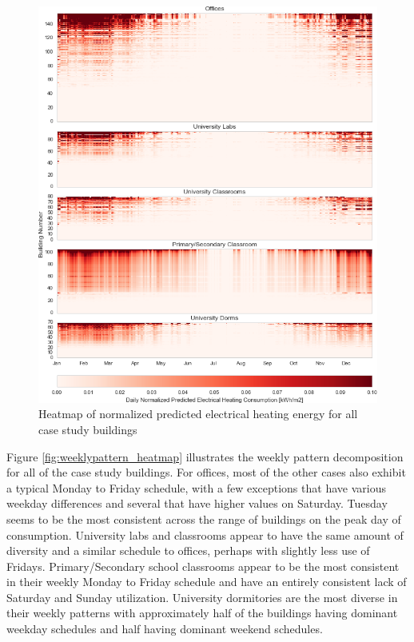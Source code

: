 \begin{figure}[ht!]
\begin{center}
\includegraphics[width=1\columnwidth]{figures/heating_heatmap/heating_heatmap}
\caption{Heatmap of normalized predicted electrical heating energy for all case study buildings
\label{fig:heating_heatmap}%
}
\end{center}
\end{figure}


Figure \ref{fig:weeklypattern_heatmap} illustrates the weekly pattern decomposition for all of the case study buildings. For offices, most of the other cases also exhibit a typical Monday to Friday schedule, with a few exceptions that have various weekday differences and several that have higher values on Saturday. Tuesday seems to be the most consistent across the range of buildings on the peak day of consumption. University labs and classrooms appear to have the same amount of diversity and a similar schedule to offices, perhaps with slightly less use of Fridays. Primary/Secondary school classrooms appear to be the most consistent in their weekly Monday to Friday schedule and have an entirely consistent lack of Saturday and Sunday utilization. University dormitories are the most diverse in their weekly patterns with approximately half of the buildings having dominant weekday schedules and half having dominant weekend schedules.

